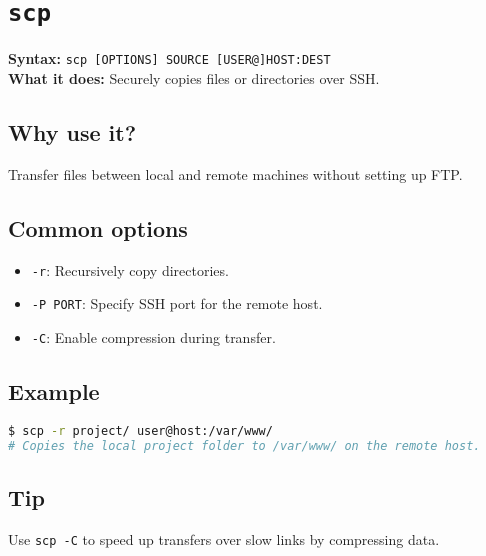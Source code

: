 \documentclass[10pt,oneside]{scrbook}
\begin{document}
\section{\texttt{scp}}
\begin{cmdbox}
  \textbf{Syntax:} \lstinline!scp [OPTIONS] SOURCE [USER@]HOST:DEST! \\
  \textbf{What it does:} Securely copies files or directories over SSH.
\end{cmdbox}
\begin{commanddetails}
  \subsection*{Why use it?}
    Transfer files between local and remote machines without setting up FTP.

  \subsection*{Common options}
    \begin{itemize}
      \item \lstinline!-r!: Recursively copy directories.
      \item \lstinline!-P PORT!: Specify SSH port for the remote host.
      \item \lstinline!-C!: Enable compression during transfer.
    \end{itemize}

  \subsection*{Example}
  \begin{lstlisting}[language=bash]
$ scp -r project/ user@host:/var/www/
# Copies the local project folder to /var/www/ on the remote host.
  \end{lstlisting}

  \subsection*{Tip}
    Use \lstinline!scp -C! to speed up transfers over slow links by compressing data.
\end{commanddetails}

\end{document}
